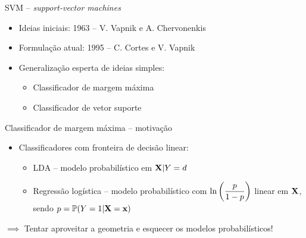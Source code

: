 \setcounter{framenumber}{0}
\date{SVM}        %


\begin{frame}{SVM -- \textit{support-vector machines}}
    \begin{itemize}
        \item Ideias iniciais: 1963 -- V. Vapnik e A. Chervonenkis
        
        \pause
        
        \item Formulação atual: 1995 -- C. Cortes e V. Vapnik
        
        \pause
        
        \item Generalização esperta de ideias simples:
        \begin{itemize}
            \item Classificador de margem máxima
            
            \item Classificador de vetor suporte
        \end{itemize}
    \end{itemize}
\end{frame}



\begin{frame}{Classificador de margem máxima -- motivação}
    \begin{itemize}
        \item Classificadores com fronteira de decisão linear:
        
        \pause
        
        \begin{itemize}
            \item LDA -- modelo probabilístico em ${\bf X} | Y = d$
            
            \pause
            
            \item Regressão logística -- modelo probabilístico com $\displaystyle \ln\left(\frac{p}{1 - p}\right)$ linear em ${\bf X}$, sendo $p = \mathbb{P}(Y = 1 | {\bf X} = {\bf x})$
        \end{itemize}
    \end{itemize}
    
    \pause
    
    \begin{center}
        $\implies$ Tentar aproveitar a geometria e esquecer os modelos probabilísticos!
    \end{center}
\end{frame}

